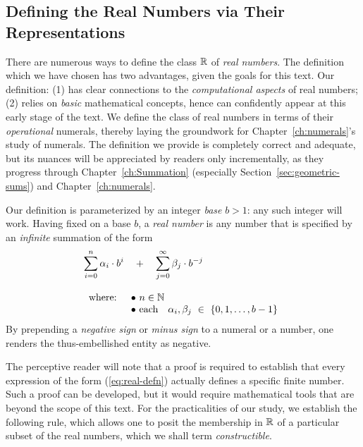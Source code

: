 \subsection{Defining the Real Numbers via Their Representations}
\label{sec:define-Reals}
   

There are numerous ways to define the class $\mathbb{R}$ of {\it real numbers}.  The definition which we have chosen has two advantages, given the goals for this text.  Our definition: (1) has clear connections to the {\em computational aspects} of real numbers; (2) relies on {\em basic} mathematical concepts, hence can confidently appear at this early stage of the text.  We define the class of real numbers in terms of their {\em operational} numerals, thereby laying the groundwork for Chapter~\ref{ch:numerals}'s study of numerals.  The definition we provide is completely correct and adequate, but its nuances will be appreciated by readers only incrementally, as they progress through Chapter~\ref{ch:Summation} (especially Section~\ref{sec:geometric-sums}) and Chapter~\ref{ch:numerals}.

 
Our definition is parameterized by an integer {\it base} $b > 1$: any such integer will work.  Having fixed on a base $b$, a {\it real number} is any number that is specified by an {\em infinite} summation of the form
\begin{equation}
\label{eq:real-defn}
\begin{array}{l}
{\displaystyle
\sum_{i=0}^n \alpha_i \cdot b^i \ \ \ + \ \ \ \sum_{j=0}^\infty \beta_j \cdot b^{-j} }  \\
  \\
\begin{array}{ll}
\mbox{where: } & \bullet \ n \in \mathbb{N} \\
               & \bullet  \ \mbox{each } \ \ \alpha_i, \beta_j \ \in \ \{0, 1, \ldots, b-1\}
\end{array}
\end{array}
\end{equation}
By prepending a {\em negative sign} or {\em minus sign} to a numeral or a number, one renders the thus-embellished entity as negative.
 
 

\smallskip

The perceptive reader will note that a proof is required to establish that every expression of the form (\ref{eq:real-defn}) actually defines a specific finite number.  Such a proof can be developed, but it would require mathematical tools that are beyond the scope of this text.  For the practicalities of our study, we establish the following rule, which allows one to posit the membership in $\mathbb{R}$ of a particular subset of the real numbers, which we shall term {\it constructible}.
 

